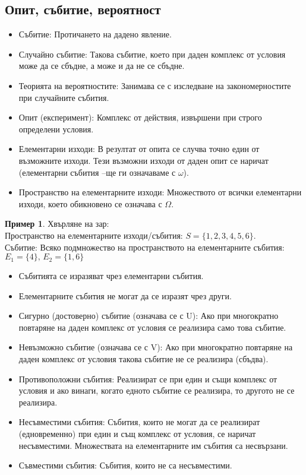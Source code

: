 \documentclass[fleqn, 12pt]{article}
\theoremstyle{definition}
\newtheorem{example}{Пример}[subsection]
\begin{document}
\subsection{Опит, събитие, вероятност}
\begin{itemize}
\item Събитие: Протичането на дадено явление.
\item Случайно събитие: Такова събитие, което при даден комплекс от условия може да се сбъдне, а може и да не се сбъдне.
\item Теорията на вероятностите: Занимава се с изследване на закономерностите при случайните събития. 
\item Опит (експеримент): Комплекс от действия, извършени при строго определени условия.
\item Елементарни изходи: В резултат от опита се случва точно един от възможните изходи. Тези възможни изходи от даден опит се наричат (елементарни събития –ще ги означаваме с $\omega$).
\item Пространство на елементарните изходи: Множеството от всички елементарни изходи, което обикновено се означава с $\Omega$.
\end{itemize}

\begin{example}
Хвърляне на зар: \\
Пространство на елементарните изходи/събития: $S = \{1,2,3,4,5,6 \}$.\\
Събитие: Всяко подмножество на пространството на елементарните събития: $E_1 = \{ 4\}, \, E_2 = \{1,6 \}$
\end{example}


\begin{itemize}
\item Събитията се изразяват чрез елементарни събития.
\item Елементарните събития не могат да се изразят чрез други.
\item Сигурно (достоверно) събитие (означава се с U): Ако при многократно повтаряне на даден комплекс от условия се реализира само това събитие.
\item Невъзможно събитие (означава се с V):  Ако при многократно повтаряне на даден комплекс от условия такова събитие не се реализира (сбъдва). 
\item Противоположни събития: Реализират се при един и същи комплекс от условия и ако винаги, когато едното събитие се реализира, то другото не се реализира.
\item Несъвместими събития: Събития, които не могат да се реализират (едновременно) при един и същ комплекс от условия, се наричат несъвместими. Множествата на елементарните им събития са несвързани.
\item Съвместими събития: Събития, които не са несъвместими.
\end{itemize}
\end{document}
